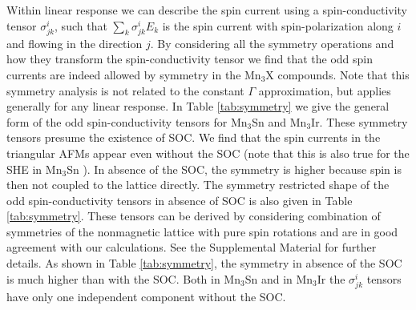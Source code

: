 \documentclass[aps,prl,reprint,amsmath,amssymb,superscriptaddress]{revtex4-1}
\begin{document}
Within linear response we can describe the spin current using a spin-conductivity tensor $\sigma^i_{jk}$, such that $\sum_k \sigma^i_{jk} E_k$ is the spin current with spin-polarization along $i$ and flowing in the direction $j$. By considering all the symmetry operations and how they transform the spin-conductivity tensor \cite{Zelezny2017,Seeman2015,symcode} we find that the odd spin currents are indeed allowed by symmetry in the Mn$_3$X compounds. Note that this symmetry analysis is not related to the constant $\Gamma$ approximation, but applies generally for any linear response. In Table \ref{tab:symmetry} we give the general form of the odd spin-conductivity tensors for Mn$_3$Sn and Mn$_3$Ir. These symmetry tensors presume the existence of SOC. We find that the spin currents in the triangular AFMs appear even without the SOC (note that this is also true for the SHE in Mn$_3$Sn \cite{Zhang2017arxiv}). In absence of the SOC, the symmetry is higher because spin is then not coupled to the lattice directly. The symmetry restricted shape of the odd spin-conductivity tensors in absence of SOC is also given in Table \ref{tab:symmetry}. These tensors can be derived by considering combination of symmetries of the nonmagnetic lattice with pure spin rotations \cite{Litvin1974,Brinkman1966} and are in good agreement with our calculations. See the Supplemental Material \cite{SMprl} for further details. As shown in  Table \ref{tab:symmetry}, the symmetry in absence of the SOC is much higher than with the SOC. Both in Mn$_3$Sn and in Mn$_3$Ir the $\sigma^i_{jk}$ tensors have only one independent component without the SOC. 
\end{document}
